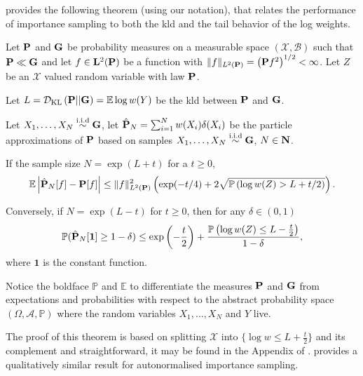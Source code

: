 \citep{Chatterjee2018Sample} provides the following theorem (using our notation), that relates the performance of importance sampling to both the \gls{kld} and the tail behavior of the log weights.
\begin{theorem}
    \label{thm:chatterje2018Thm1}
     Let $\P$ and $\G$ be probability measures on a measurable space $(\mathcal X, \mathcal B)$ such that $\P \ll \G$ and let $f \in \mathbf L^2(\P)$ be a function with $\lVert f \rVert_{L^{2}(\P)} = \left( \P f^{2} \right)^{1 / 2} < 
     \infty$. Let $Z$ be an $\mathcal X$ valued random variable with law $\P$. 
     
     Let $L = \Dkl{\P}{\G} = \mathbb E \log w(Y)$ be the \acrshort{kld} between $\P$ and $\G$. 
     
     Let $X_1, \dots, X_N \iid \G$, let $\hat \P_N = \sum_{i = 1}^N w(X_i) \delta(X_i)$ be the particle approximations of $\P$  based on samples $X_1, \dots, X_N\iid \G$, $N \in \N$. 
     
     If the sample size $N = \exp\left( L + t \right)$ for a $t \geq 0$,
     \begin{align} \label{eq:chatterje-upper-bound}\mathbb E \left\lvert \hat \P_N[f] - \P [f] \right\rvert \leq \lVert f \rVert^2_{L^2(\P)} \left(\exp(-t / 4) + 2 \sqrt{\mathbb P \left( \log w(Z) > L + t / 2 \right)}\right). \end{align}

    Conversely, if $N = \exp \left( L - t \right)$ for $t \geq 0$, then for any $\delta \in (0,1)$ 
    \begin{align}
        \label{eq:chatterje-lower-bound}
    \mathbb P (\hat \P_{N}[ \mathbf 1 ] \geq 1 - \delta) \leq \exp \left( -\frac{t}{2} \right) + \frac{\mathbb P \left( \log w(Z) \leq L -\frac{t}{2} \right)}{ 1- \delta},
    \end{align}
    where $\mathbf 1$ is the constant function. 

     Notice the boldface $\mathbb P$ and $\mathbb E$ to differentiate the measures $\P$ and $\G$ from expectations and probabilities with respect to the abstract probability space $\left( \Omega, \mathcal A, \mathbb P \right)$ where the random variables $X_{1}, \dots, X_{N}$ and $Y$ live.
\end{theorem}

The proof of this theorem is based on splitting $\mathcal X$ into $\{\log w \leq L + \frac{t}{2}\} $ and its complement and straightforward, it may be found in the Appendix of \citep{Chatterjee2018Sample}. \citep[Theorem 1.2]{Chatterjee2018Sample} provides a qualitatively similar result for autonormalised importance sampling.

